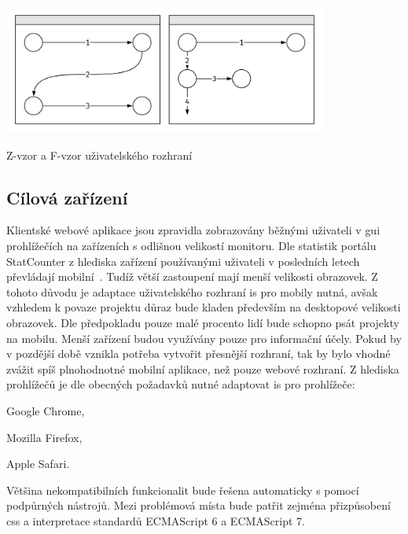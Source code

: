 \begin{fig:illustration}
   \includegraphics[width=0.8\textwidth]{images/dia-design-patterns.pdf}
   \caption{Z-vzor a F-vzor uživatelského rozhraní}\label{pic:dia-design-patterns}
\end{fig:illustration}




\subsection{Cílová zařízení}

Klientské webové aplikace jsou zpravidla zobrazovány běžnými uživateli v \gls{gui} prohlížečích na zařízeních s odlišnou velikostí monitoru. Dle statistik portálu StatCounter z hlediska zařízení používanými uživateli v posledních letech převládají mobilní~\cite{statCounterDevices}. Tudíž větší zastoupení mají menší velikosti obrazovek. Z tohoto důvodu je adaptace uživatelského rozhraní \gls{is} pro mobily nutná, avšak vzhledem k povaze projektu důraz bude kladen především na desktopové velikosti obrazovek. Dle předpokladu pouze malé procento lidí bude schopno psát projekty na mobilu. Menší zařízení budou využívány pouze pro informační účely. Pokud by v pozdější době vznikla potřeba vytvořit přesnější rozhraní, tak by bylo vhodné zvážit spíš plnohodnotné mobilní aplikace, než pouze webové rozhraní. Z hlediska prohlížečů je dle obecných požadavků nutné adaptovat \gls{is} pro prohlížeče:
\begin{ulnar}
   \item Google Chrome,
   \item Mozilla Firefox,
   \item Apple Safari.
\end{ulnar}

Většina nekompatibilních funkcionalit bude řešena automaticky s pomocí podpůrných nástrojů. Mezi problémová místa bude patřit zejména přizpůsobení \gls{css} a interpretace standardů ECMAScript 6 a ECMAScript 7.


